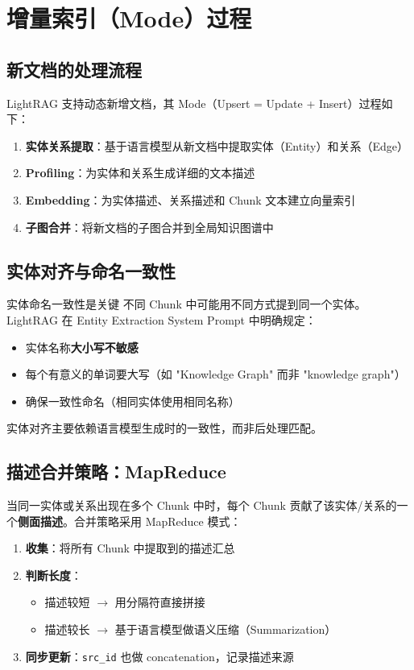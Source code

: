 \section{增量索引（Mode）过程}

\subsection{新文档的处理流程}

LightRAG 支持动态新增文档，其 Mode（Upsert = Update + Insert）过程如下：

\begin{enumerate}
    \item \textbf{实体关系提取}：基于语言模型从新文档中提取实体（Entity）和关系（Edge）
    \item \textbf{Profiling}：为实体和关系生成详细的文本描述
    \item \textbf{Embedding}：为实体描述、关系描述和 Chunk 文本建立向量索引
    \item \textbf{子图合并}：将新文档的子图合并到全局知识图谱中
\end{enumerate}

\subsection{实体对齐与命名一致性}

\begin{warningbox}{实体命名一致性是关键}
不同 Chunk 中可能用不同方式提到同一个实体。LightRAG 在 Entity Extraction System Prompt 中明确规定：
\begin{itemize}
    \item 实体名称\textbf{大小写不敏感}
    \item 每个有意义的单词要大写（如 "Knowledge Graph" 而非 "knowledge graph"）
    \item 确保一致性命名（相同实体使用相同名称）
\end{itemize}
实体对齐主要依赖语言模型生成时的一致性，而非后处理匹配。
\end{warningbox}

\subsection{描述合并策略：MapReduce}

当同一实体或关系出现在多个 Chunk 中时，每个 Chunk 贡献了该实体/关系的一个\textbf{侧面描述}。合并策略采用 MapReduce 模式：

\begin{enumerate}
    \item \textbf{收集}：将所有 Chunk 中提取到的描述汇总
    \item \textbf{判断长度}：
    \begin{itemize}
        \item 描述较短 $\rightarrow$ 用分隔符直接拼接
        \item 描述较长 $\rightarrow$ 基于语言模型做语义压缩（Summarization）
    \end{itemize}
    \item \textbf{同步更新}：\texttt{src\_id} 也做 concatenation，记录描述来源
\end{enumerate}

